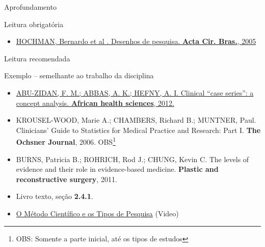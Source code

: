 \documentclass{beamer}
\begin{document}
\begin{frame}{Aprofundamento}
  \begin{block}{Leitura obrigatória}
    \begin{itemize}
      \scriptsize
    \item \href{http://dx.doi.org/10.1590/S0102-86502005000800002}{HOCHMAN, Bernardo et al . Desenhos de pesquisa. {\bf Acta Cir. Bras.}, 2005}
    \end{itemize}
  \end{block}
  \medskip
  \begin{block}{Leitura recomendada}
    \begin{exampleblock}{\tiny Exemplo -- semelhante ao trabalho da disciplina}
      \begin{itemize}
        \tiny
      \item \href{http://dx.doi.org/10.4314/ahs.v12i4.25}{ABU-ZIDAN, F. M.; ABBAS, A. K.; HEFNY, A. I. Clinical “case series”: a concept analysis. {\bf African health sciences}, 2012.}
      \end{itemize}
    \end{exampleblock}
    \begin{itemize}
    \tiny
    \item KROUSEL-WOOD, Marie A.; CHAMBERS, Richard B.; MUNTNER, Paul. Clinicians' Guide to Statistics for Medical Practice and Research: Part I. {\bf The Ochsner Journal}, 2006. \alert{OBS}\footnote{\tiny OBS: Somente a parte inicial, até os tipos de estudos}
    \item BURNS, Patricia B.; ROHRICH, Rod J.; CHUNG, Kevin C. The levels of evidence and their role in evidence-based medicine. {\bf Plastic and reconstructive surgery}, 2011.
      \bigskip
    \item Livro texto, seção {\bf 2.4.1}.
    \item \href{https://youtu.be/ey9bTshV308}{O Método Científico e os Tipos de Pesquisa} (Video)
    \end{itemize}
  \end{block}
\end{frame}


\end{document}

